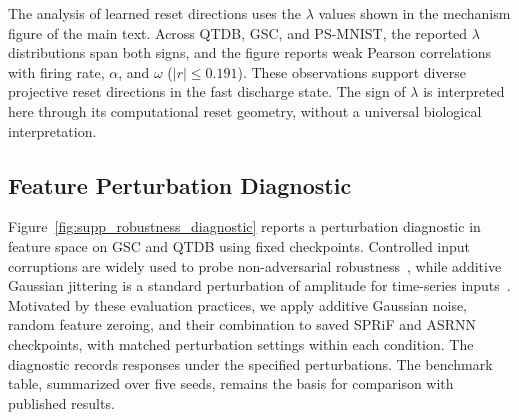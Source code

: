 \documentclass[letterpaper]{article}
\begin{document}
The analysis of learned reset directions uses the $\lambda$ values shown in the mechanism figure of the main text. Across QTDB, GSC, and PS-MNIST, the reported $\lambda$ distributions span both signs, and the figure reports weak Pearson correlations with firing rate, $\alpha$, and $\omega$ ($|r|\leq0.191$). These observations support diverse projective reset directions in the fast discharge state. The sign of $\lambda$ is interpreted here through its computational reset geometry, without a universal biological interpretation.

\subsection{Feature Perturbation Diagnostic}
\label{supp:sec:perturbation-diagnostic}

Figure~\ref{fig:supp_robustness_diagnostic} reports a perturbation diagnostic in feature space on GSC and QTDB using fixed checkpoints. Controlled input corruptions are widely used to probe non-adversarial robustness~\cite{hendrycks2019benchmarking}, while additive Gaussian jittering is a standard perturbation of amplitude for time-series inputs~\cite{iwana2021empirical}. Motivated by these evaluation practices, we apply additive Gaussian noise, random feature zeroing, and their combination to saved SPRiF and ASRNN checkpoints, with matched perturbation settings within each condition. The diagnostic records responses under the specified perturbations. The benchmark table, summarized over five seeds, remains the basis for comparison with published results.


\end{document}
